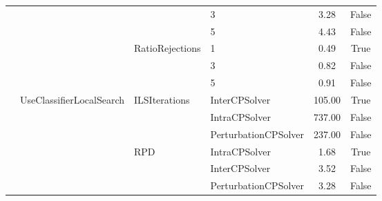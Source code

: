 \begin{table}[!ht]
\begin{tabular}{@{}l l l l c c @{}}
		                                      &                                              &                                     & 3                    & 3.28            & False           \\\cmidrule(lr){4-6}
		                                      &                                              &                                     & 5                    & 4.43            & False           \\\cmidrule(lr){3-6}
		                                      &                                              & \multirow[t]{3}{*}{RatioRejections} & 1                    & 0.49            & True            \\\cmidrule(lr){4-6}
		                                      &                                              &                                     & 3                    & 0.82            & False           \\\cmidrule(lr){4-6}
		                                      &                                              &                                     & 5                    & 0.91            & False           \\\cmidrule(lr){2-6}
		                                      & \multirow[t]{9}{*}{UseClassifierLocalSearch} & \multirow[t]{3}{*}{ILSIterations}   & InterCPSolver        & 105.00          & True            \\\cmidrule(lr){4-6}
		                                      &                                              &                                     & IntraCPSolver        & 737.00          & False           \\\cmidrule(lr){4-6}
		                                      &                                              &                                     & PerturbationCPSolver & 237.00          & False           \\\cmidrule(lr){3-6}
		                                      &                                              & \multirow[t]{3}{*}{RPD}             & IntraCPSolver        & 1.68            & True            \\\cmidrule(lr){4-6}
		                                      &                                              &                                     & InterCPSolver        & 3.52            & False           \\\cmidrule(lr){4-6}
		                                      &                                              &                                     & PerturbationCPSolver & 3.28            & False           \\\cmidrule(lr){3-6}

\end{tabular}
\end{table}
